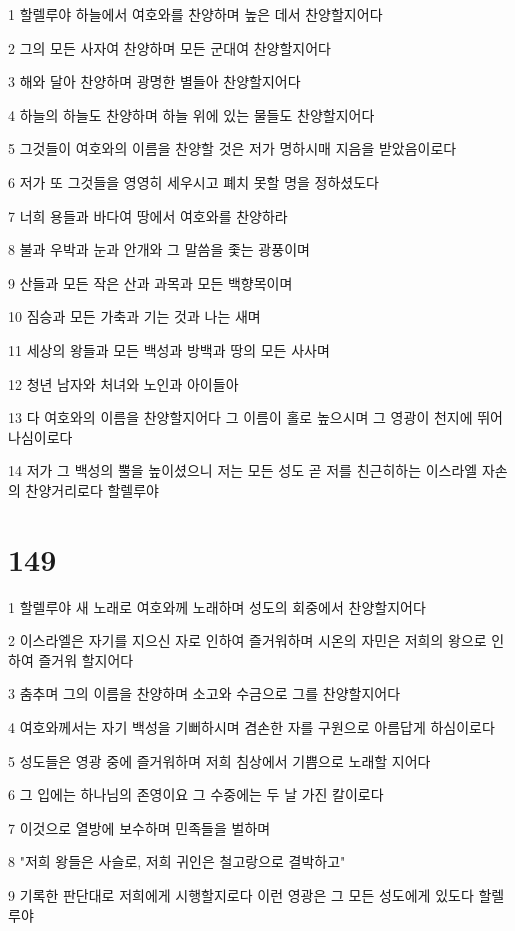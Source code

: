 \par 1 할렐루야 하늘에서 여호와를 찬양하며 높은 데서 찬양할지어다
\par 2 그의 모든 사자여 찬양하며 모든 군대여 찬양할지어다
\par 3 해와 달아 찬양하며 광명한 별들아 찬양할지어다
\par 4 하늘의 하늘도 찬양하며 하늘 위에 있는 물들도 찬양할지어다
\par 5 그것들이 여호와의 이름을 찬양할 것은 저가 명하시매 지음을 받았음이로다
\par 6 저가 또 그것들을 영영히 세우시고 폐치 못할 명을 정하셨도다
\par 7 너희 용들과 바다여 땅에서 여호와를 찬양하라
\par 8 불과 우박과 눈과 안개와 그 말씀을 좇는 광풍이며
\par 9 산들과 모든 작은 산과 과목과 모든 백향목이며
\par 10 짐승과 모든 가축과 기는 것과 나는 새며
\par 11 세상의 왕들과 모든 백성과 방백과 땅의 모든 사사며
\par 12 청년 남자와 처녀와 노인과 아이들아
\par 13 다 여호와의 이름을 찬양할지어다 그 이름이 홀로 높으시며 그 영광이 천지에 뛰어나심이로다
\par 14 저가 그 백성의 뿔을 높이셨으니 저는 모든 성도 곧 저를 친근히하는 이스라엘 자손의 찬양거리로다 할렐루야

\chapter{149}

\par 1 할렐루야 새 노래로 여호와께 노래하며 성도의 회중에서 찬양할지어다
\par 2 이스라엘은 자기를 지으신 자로 인하여 즐거워하며 시온의 자민은 저희의 왕으로 인하여 즐거워 할지어다
\par 3 춤추며 그의 이름을 찬양하며 소고와 수금으로 그를 찬양할지어다
\par 4 여호와께서는 자기 백성을 기뻐하시며 겸손한 자를 구원으로 아름답게 하심이로다
\par 5 성도들은 영광 중에 즐거워하며 저희 침상에서 기쁨으로 노래할 지어다
\par 6 그 입에는 하나님의 존영이요 그 수중에는 두 날 가진 칼이로다
\par 7 이것으로 열방에 보수하며 민족들을 벌하며
\par 8 "저희 왕들은 사슬로, 저희 귀인은 철고랑으로 결박하고"
\par 9 기록한 판단대로 저희에게 시행할지로다 이런 영광은 그 모든 성도에게 있도다 할렐루야

